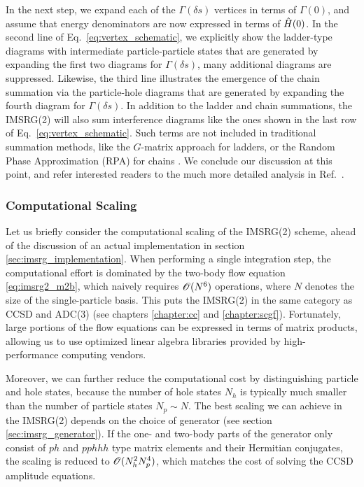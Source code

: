 In the next step, we expand each of the $\Gamma(\delta s)$ vertices in
terms of $\Gamma(0)$, and assume that energy denominators are now
expressed in terms of $\hat{H}(0)$. In the second line of Eq.~\eqref{eq:vertex_schematic},
we explicitly show the ladder-type diagrams with intermediate 
particle-particle states that are generated by expanding
the first two diagrams for $\Gamma(\delta s)$, many additional diagrams
are suppressed. Likewise, the third line illustrates the emergence of 
the chain summation via the particle-hole diagrams that 
are generated by expanding the fourth diagram for $\Gamma(\delta s)$.
In addition to the ladder and chain summations, the IMSRG(2) will also
sum interference diagrams like the ones shown in the last row of 
Eq.~\eqref{eq:vertex_schematic}.
Such terms are not included in traditional summation methods, like
the $G$-matrix approach for ladders, or the Random Phase Approximation
(RPA) for chains \cite{Day:1967zl,Brandow:1967tg,Fetter:2003ve}. We
conclude our discussion at this point, and refer interested readers
to the much more detailed analysis in Ref.~\cite{Hergert:2016jk}.

%
%
\subsubsection{Computational Scaling}
Let us briefly consider the computational scaling of the IMSRG(2) scheme,
ahead of the discussion of an actual implementation in section \ref{sec:imsrg_implementation}.
When performing a single integration step, the computational effort is 
dominated by the two-body flow equation \eqref{eq:imsrg2_m2b}, which 
naively requires $\mathcal{O}(N^6)$ operations, where $N$ denotes the size of
the single-particle basis. This puts the IMSRG(2) in the same category 
as CCSD and ADC(3) (see chapters \ref{chapter:cc} and \ref{chapter:scgf}).
Fortunately, large portions of the flow equations can be expressed in 
terms of matrix products, allowing us to use optimized linear algebra 
libraries provided by high-performance computing vendors. 

Moreover, we can further reduce the computational cost by distinguishing 
particle and hole states, because the number of hole states $N_h$ is 
typically much smaller than the number of particle states $N_p\sim N$. 
The best scaling we can achieve in the IMSRG(2) depends on the choice of 
generator (see section \ref{sec:imsrg_generator}). If the one- and two-body parts of the 
generator only consist of $ph$ and $pphhh$ type matrix elements and their 
Hermitian conjugates, the scaling is reduced to $\mathcal{O}(N_h^2N_p^4)$, 
which matches the cost of solving the CCSD amplitude equations.


